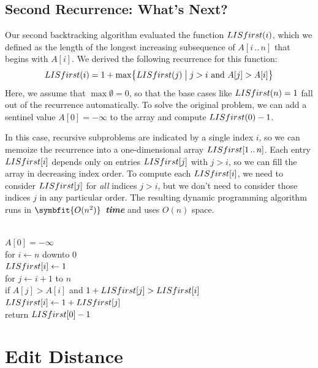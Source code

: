 \subsection{Second Recurrence: What's Next?}

Our second backtracking algorithm evaluated the function $LISfirst(i)$, which we defined as the length of the longest increasing subsequence of $A[i\,..\,n]$ that begins with $A[i]$.
We derived the following recurrence for this function:
\[
LISfirst(i) = 1 + \max\bigl\{LISfirst(j) \bigm| j > i \text{ and } A[j] > A[i]\bigr\}
\]
Here, we assume that $\max\emptyset = 0$, so that the base cases like $LISfirst(n) = 1$ fall out of the recurrence automatically.
To solve the original problem, we can add a sentinel value $A[0] = -\infty$ to the array and compute $LISfirst(0) - 1$.

In this case, recursive subproblems are indicated by a single index $i$, so we can memoize the recurrence into a one-dimensional array $LISfirst[1\,..\,n]$.
Each entry $LISfirst[i]$ depends only on entries $LISfirst[j]$ with $j > i$, so we can fill the array in decreasing index order.
To compute each $LISfirst[i]$, we need to consider $LISfirst[j]$ for \textit{all} indices $j > i$, but we don’t need to consider those indices $j$ in any particular order.
The resulting dynamic programming algorithm runs in \textbf{\textit{$\symbfit{O(n^2)}$ time}} and uses $O(n)$ space.

\begin{pseudocode}
\\
$A[0] = -\infty$ \\
for $i \gets n$ downto $0$\\
\Indent $LISfirst[i] \gets 1$\\
\Indent for $j \gets i+1$ to $n$ \\
\Indent\Indent if $A[j] > A[i]$ and $1 + LISfirst[j] > LISfirst[i]$\\
\Indent\Indent\Indent $LISfirst[i] \gets 1 + LISfirst[j]$\\
return $LISfirst[0] - 1$ 
\end{pseudocode}

\section{Edit Distance}
\label{sec:3.7}


